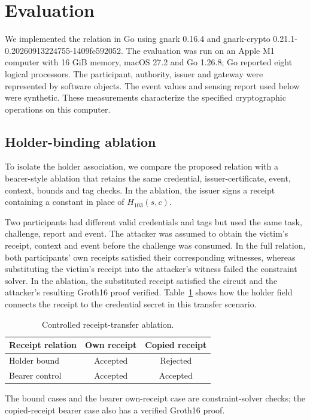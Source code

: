 \documentclass[pdflatex,iicol,sn-mathphys-num]{sn-jnl}
\begin{document}
\section{Evaluation}
\label{sec:evaluation}

We implemented the relation in Go using gnark 0.16.4 and gnark-crypto 0.21.1-0.20260913224755-1409fe592052. The evaluation was run on an Apple M1 computer with 16 GiB memory, macOS 27.2 and Go 1.26.8; Go reported eight logical processors. The participant, authority, issuer and gateway were represented by software objects. The event values and sensing report used below were synthetic. These measurements characterize the specified cryptographic operations on this computer.

\subsection{Holder-binding ablation}
To isolate the holder association, we compare the proposed relation with a bearer-style ablation that retains the same credential, issuer-certificate, event, context, bounds and tag checks. In the ablation, the issuer signs a receipt containing a constant in place of $H_{103}(s,c)$.

Two participants had different valid credentials and tags but used the same task, challenge, report and event. The attacker was assumed to obtain the victim's receipt, context and event before the challenge was consumed. In the full relation, both participants' own receipts satisfied their corresponding witnesses, whereas substituting the victim's receipt into the attacker's witness failed the constraint solver. In the ablation, the substituted receipt satisfied the circuit and the attacker's resulting Groth16 proof verified. Table~\ref{tab:ablation} shows how the holder field connects the receipt to the credential secret in this transfer scenario.

\begin{table}[t]
\centering\caption{Controlled receipt-transfer ablation.}\label{tab:ablation}
\begin{tabular}{@{}lcc@{}}\toprule
Receipt relation & Own receipt & Copied receipt \\\midrule
Holder bound & Accepted & Rejected \\
Bearer control & Accepted & Accepted \\\bottomrule
\end{tabular}\par\vspace{2pt}
\footnotesize The bound cases and the bearer own-receipt case are constraint-solver checks; the copied-receipt bearer case also has a verified Groth16 proof.
\end{table}
\end{document}
